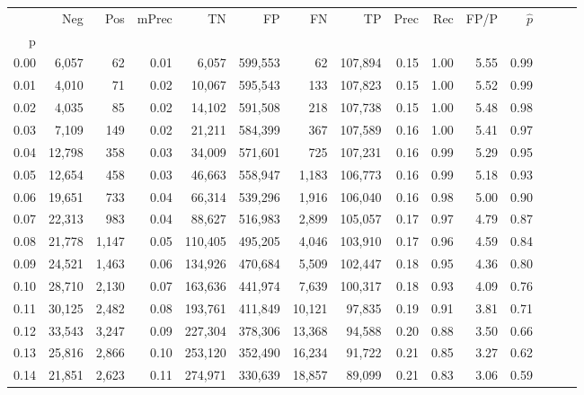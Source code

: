 \begin{tabular}{rrrrrrrrrrrrrrr}
\toprule
{} &     Neg &    Pos & mPrec &       TN &       FP &       FN &       TP &  Prec &   Rec &  FP/P & $\hat{p}$ \\
p    &         &        &       &          &          &          &          &       &       &       &           \\
\midrule
0.00 &   6,057 &     62 &  0.01 &    6,057 &  599,553 &       62 &  107,894 &  0.15 &  1.00 &  5.55 &      0.99 \\
0.01 &   4,010 &     71 &  0.02 &   10,067 &  595,543 &      133 &  107,823 &  0.15 &  1.00 &  5.52 &      0.99 \\
0.02 &   4,035 &     85 &  0.02 &   14,102 &  591,508 &      218 &  107,738 &  0.15 &  1.00 &  5.48 &      0.98 \\
0.03 &   7,109 &    149 &  0.02 &   21,211 &  584,399 &      367 &  107,589 &  0.16 &  1.00 &  5.41 &      0.97 \\
0.04 &  12,798 &    358 &  0.03 &   34,009 &  571,601 &      725 &  107,231 &  0.16 &  0.99 &  5.29 &      0.95 \\
0.05 &  12,654 &    458 &  0.03 &   46,663 &  558,947 &    1,183 &  106,773 &  0.16 &  0.99 &  5.18 &      0.93 \\
0.06 &  19,651 &    733 &  0.04 &   66,314 &  539,296 &    1,916 &  106,040 &  0.16 &  0.98 &  5.00 &      0.90 \\
0.07 &  22,313 &    983 &  0.04 &   88,627 &  516,983 &    2,899 &  105,057 &  0.17 &  0.97 &  4.79 &      0.87 \\
0.08 &  21,778 &  1,147 &  0.05 &  110,405 &  495,205 &    4,046 &  103,910 &  0.17 &  0.96 &  4.59 &      0.84 \\
0.09 &  24,521 &  1,463 &  0.06 &  134,926 &  470,684 &    5,509 &  102,447 &  0.18 &  0.95 &  4.36 &      0.80 \\
0.10 &  28,710 &  2,130 &  0.07 &  163,636 &  441,974 &    7,639 &  100,317 &  0.18 &  0.93 &  4.09 &      0.76 \\
0.11 &  30,125 &  2,482 &  0.08 &  193,761 &  411,849 &   10,121 &   97,835 &  0.19 &  0.91 &  3.81 &      0.71 \\
0.12 &  33,543 &  3,247 &  0.09 &  227,304 &  378,306 &   13,368 &   94,588 &  0.20 &  0.88 &  3.50 &      0.66 \\
0.13 &  25,816 &  2,866 &  0.10 &  253,120 &  352,490 &   16,234 &   91,722 &  0.21 &  0.85 &  3.27 &      0.62 \\
0.14 &  21,851 &  2,623 &  0.11 &  274,971 &  330,639 &   18,857 &   89,099 &  0.21 &  0.83 &  3.06 &      0.59 \\

\end{tabular}
